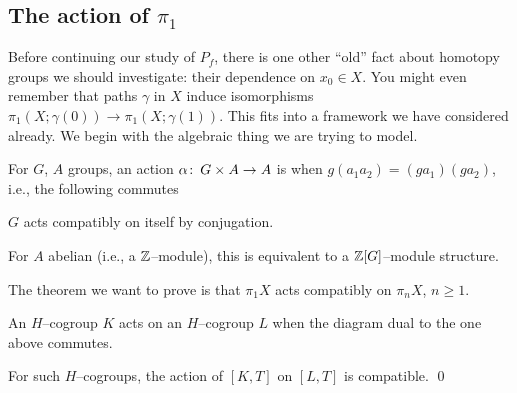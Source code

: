 \begin{subappendices}

\section{The action of $\pi_1$}

Before continuing our study of $P_f$, there is one other ``old'' fact about homotopy groups we should investigate: their dependence on $x_0 \in X$.  You might even remember that paths $\gamma$ in $X$ induce isomorphisms $\pi_1(X; \gamma(0)) \to \pi_1(X; \gamma(1))$.  This fits into a framework we have considered already.  We begin with the algebraic thing we are trying to model.

\begin{definition}
For $G$, $A$ groups, an action $\alpha\colon\thinspace G \times A \to A$ is  when $g(a_1 a_2) = (g a_1)(g a_2)$, i.e., the following commutes
\begin{center}
\end{center}
\end{definition}

\begin{example}
$G$ acts compatibly on itself by conjugation.
\end{example}

\begin{example}
For $A$ abelian (i.e., a $\mathbb Z$--module), this is equivalent to a $\mathbb Z[G]$--module structure.
\end{example}

The theorem we want to prove is that $\pi_1 X$ acts compatibly on $\pi_n X$, $n \ge 1$.

\begin{definition}
An $H$--cogroup $K$ acts  on an $H$--cogroup $L$ when the diagram dual to the one above commutes.
\end{definition}

\begin{corollary}
For such $H$--cogroups, the action of $[K, T]$ on $[L, T]$ is compatible. \qed
\end{corollary}


\end{subappendices}
